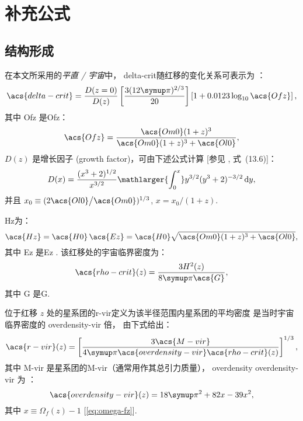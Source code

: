 
\chapter{补充公式}
\label{chap:formulas}

\section{结构形成}

在本文所采用的\emph{平直 \lcdm/ 宇宙}中，
\ac{delta-crit}随红移的变化关系可表示为 \cite{kitayama1996,randall2002}：
\begin{equation}
  \label{eq:delta-crit}
  \acs{delta-crit} = \frac{D(z=0)}{D(z)}
    \left[ \frac{3 (12\Cpi)^{2/3}}{20} \right]
    \left[1 + 0.0123 \log_{10} \acs{Ofz} \right] ,
\end{equation}
其中 \acs{Ofz} 是\acl{Ofz}：
\begin{equation}
  \label{eq:omega-fz}
  \acs{Ofz} = \frac{\acs{Om0} (1+z)^3}{\acs{Om0} (1+z)^3 + \acs{Ol0}} ,
\end{equation}
$D(z)$ 是增长因子 (growth factor)，可由下述公式计算
[参见 , 式~(13.6)]：
\begin{equation}
  \label{eq:growth-factor}
  D(x) = \frac{(x^3 + 2)^{1/2}}{x^{3/2}}
    \mathlarger{\int_0^x} y^{3/2} (y^3 + 2)^{-3/2} \,\D{y} ,
\end{equation}
并且 $x_0 \equiv (2 \acs{Ol0} \big/ \acs{Om0})^{1/3}$,
$x = x_0 \big/ (1+z)$.

\acl{Hz}为：
\begin{equation}
  \label{eq:hubble-z}
  \acs{Hz} = \acs{H0} \, \acs{Ez}
    = \acs{H0} \sqrt{\acs{Om0} (1+z)^3 + \acs{Ol0}} ,
\end{equation}
其中 \acs{Ez} 是\acl{Ez} \cite{hogg1999}.
该红移处的宇宙临界密度为：
\begin{equation}
  \label{eq:rho-crit}
  \acs{rho-crit}(z) = \frac{3 H^2(z)}{8 \Cpi \acs{G}} ,
\end{equation}
其中 \acs{G} 是\acl{G}.

位于红移 $z$ 处的星系团的\acf{r-vir}定义为该半径范围内星系团的平均密度
是当时宇宙临界密度的 \acs{overdensity-vir} 倍，
由下式给出：
\begin{equation}
  \label{eq:radius-virial}
  \acs{r-vir}(z) = \left[
    \frac{3 \acs{M-vir}}{4\Cpi \acs{overdensity-vir} \acs{rho-crit}(z)}
  \right]^{1/3},
\end{equation}
其中 \acs{M-vir} 是星系团的\acl{M-vir}（通常用作其总引力质量），
\acf{overdensity} \acs{overdensity-vir} 为 \cite{bryan1998}：
\begin{equation}
  \label{eq:delta-vir}
  \acs{overdensity-vir}(z) = 18\Cpi^2 + 82 x - 39 x^2,
\end{equation}
其中 $x \equiv \Omega_f(z) - 1$ [\autoref{eq:omega-fz}].


